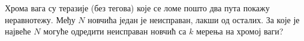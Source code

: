 Хрома вага су теразије (без тегова) које се ломе пошто два пута покажу
неравнотежу.
Међу $N$ новчића један је неисправан, лакши од осталих.
За које је највеће $N$ могуће одредити неисправан новчић са $k$ мерења на
хромој ваги?

\solution


